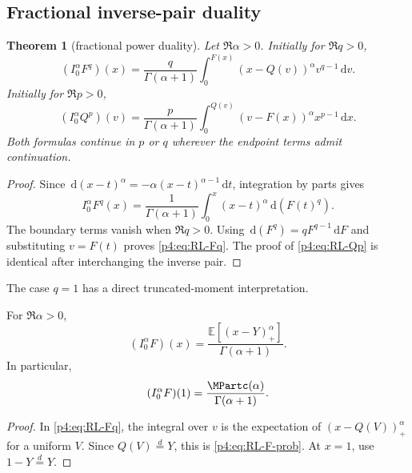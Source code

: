 \documentclass[11pt,oneside]{article}
\newtheorem{theorem}{Theorem}[section]
\theoremstyle{definition}
\theoremstyle{remark}
\newcommand{\F}{F}
\newcommand{\Q}{Q}
\newcommand{\E}{\mathbb E}
\newcommand{\dd}{\,\mathrm d}
\newcommand{\1}{\mathbf 1}
\begin{document}
\subsection{Fractional inverse-pair duality}

\begin{theorem}[fractional power duality]\label{p4:thm:fractional-duality}
Let \(\Re\alpha>0\).  Initially for \(\Re q>0\),
\begin{equation}\label{p4:eq:RL-Fq}
 (I_0^\alpha\F^q)(x)
 =\frac{q}{\Gamma(\alpha+1)}
 \int_0^{\F(x)}(x-\Q(v))^\alpha v^{q-1}\dd v.
\end{equation}
Initially for \(\Re p>0\),
\begin{equation}\label{p4:eq:RL-Qp}
 (I_0^\alpha\Q^p)(v)
 =\frac{p}{\Gamma(\alpha+1)}
 \int_0^{\Q(v)}(v-\F(x))^\alpha x^{p-1}\dd x.
\end{equation}
Both formulas continue in \(p\) or \(q\) wherever the endpoint terms admit continuation.
\end{theorem}

\begin{proof}
Since \(\dd(x-t)^\alpha=-\alpha(x-t)^{\alpha-1}\dd t\), integration by parts gives
\[
 I_0^\alpha\F^q(x)
 =\frac1{\Gamma(\alpha+1)}
 \int_0^x(x-t)^\alpha\dd(\F(t)^q).
\]
The boundary terms vanish when \(\Re q>0\).  Using
\(\dd(\F^q)=q\F^{q-1}\dd\F\) and substituting \(v=\F(t)\) proves
\cref{p4:eq:RL-Fq}.  The proof of \cref{p4:eq:RL-Qp} is identical after interchanging the
inverse pair.
\end{proof}

The case \(q=1\) has a direct truncated-moment interpretation.

\begin{corollary}\label{p4:cor:RL-F-prob}
For \(\Re\alpha>0\),
\begin{equation}\label{p4:eq:RL-F-prob}
 (I_0^\alpha\F)(x)
 =\frac{\E[(x-Y)_+^\alpha]}{\Gamma(\alpha+1)}.
\end{equation}
In particular,
\begin{equation}\label{p4:eq:RL-F-at-one}
 (I_0^\alpha\F)(1)
 =\frac{\MPartc(\alpha)}{\Gamma(\alpha+1)}.
\end{equation}
\end{corollary}

\begin{proof}
In \cref{p4:eq:RL-Fq}, the integral over \(v\) is the expectation of
\((x-\Q(V))_+^\alpha\) for a uniform \(V\).  Since \(\Q(V)\overset d=Y\), this is
\cref{p4:eq:RL-F-prob}.  At \(x=1\), use \(1-Y\overset d=Y\).
\end{proof}
\end{document}
